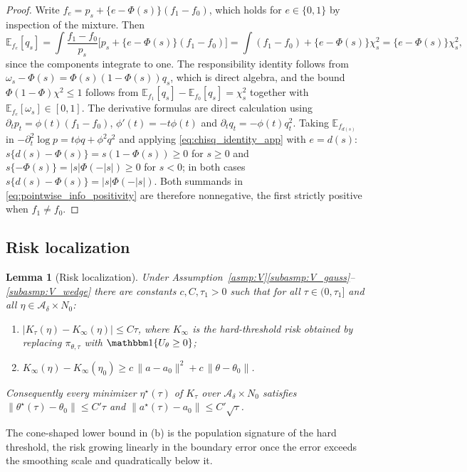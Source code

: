 \documentclass[11pt]{article}
\newtheorem{lemma}{Lemma}
\theoremstyle{definition}
\theoremstyle{plain}
\newcommand{\E}{\mathbb{E}}
\begin{document}
\begin{proof}
Write $f_e=p_s+\{e-\Phi(s)\}(f_1-f_0)$, which holds for $e\in\{0,1\}$ by inspection of the mixture. Then
\[
\E_{f_e}[q_s]=\int\frac{f_1-f_0}{p_s}\Big[p_s+\{e-\Phi(s)\}(f_1-f_0)\Big]
=\int(f_1-f_0)+\{e-\Phi(s)\}\chi^2_s=\{e-\Phi(s)\}\chi^2_s,
\]
since the components integrate to one. The responsibility identity follows from $\omega_s-\Phi(s)=\Phi(s)(1-\Phi(s))q_s$, which is direct algebra, and the bound $\Phi(1-\Phi)\chi^2\le1$ follows from $\E_{f_1}[q_s]-\E_{f_0}[q_s]=\chi^2_s$ together with $\E_{f_e}[\omega_s]\in[0,1]$. The derivative formulas are direct calculation using $\partial_tp_t=\phi(t)(f_1-f_0)$, $\phi'(t)=-t\phi(t)$ and $\partial_tq_t=-\phi(t)q_t^2$. Taking $\E_{f_{d(s)}}$ in $-\partial^2_t\log p=t\phi q+\phi^2q^2$ and applying \eqref{eq:chisq_identity_app} with $e=d(s)$:
$s\{d(s)-\Phi(s)\}=s(1-\Phi(s))\ge0$ for $s\ge0$ and $s\{-\Phi(s)\}=|s|\Phi(-|s|)\ge0$ for $s<0$; in both cases $s\{d(s)-\Phi(s)\}=|s|\Phi(-|s|)$. Both summands in \eqref{eq:pointwise_info_positivity} are therefore nonnegative, the first strictly positive when $f_1\ne f_0$.
\end{proof}

\subsection{Risk localization}

\begin{lemma}[Risk localization]
\label{lem:risk_localization}
Under Assumption~\ref{asmp:V}\ref{subasmp:V_gauss}--\ref{subasmp:V_wedge} there are constants $c,C,\tau_1>0$ such that for all $\tau\in(0,\tau_1]$ and all $\eta\in\mathcal A_\delta\times N_0$:
\begin{enumerate}[label=(\alph*),nosep]
\item $|K_\tau(\eta)-K_\infty(\eta)|\le C\tau$, where $K_\infty$ is the hard-threshold risk obtained by replacing $\pi_{\theta,\tau}$ with $\mathbbm 1\{U_\theta\ge0\}$;
\item $K_\infty(\eta)-K_\infty(\eta_0)\ge c\,\|a-a_0\|^2+c\,\|\theta-\theta_0\|$.
\end{enumerate}
Consequently every minimizer $\eta^\star(\tau)$ of $K_\tau$ over $\mathcal A_\delta\times N_0$ satisfies
$\|\theta^\star(\tau)-\theta_0\|\le C'\tau$ and $\|a^\star(\tau)-a_0\|\le C'\sqrt\tau$.
\end{lemma}

The cone-shaped lower bound in (b) is the population signature of the hard threshold, the risk growing linearly in the boundary error once the error exceeds the smoothing scale and quadratically below it.
\end{document}
